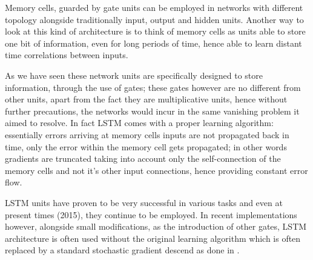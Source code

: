 Memory cells, guarded by gate units can be employed in networks with different topology alongside traditionally 
input, output and hidden units. Another way to look at this kind of architecture is to think of memory cells as units 
able to store one bit of information, even for long periods of time, hence able to learn distant time correlations 
between inputs.

As we have seen these network units are specifically designed to store information, through the use of gates; these 
gates however are no different from other units, apart from the fact they are multiplicative units, hence without 
further precautions, the networks would incur in the same vanishing problem it aimed to resolve. In fact LSTM comes with 
a proper learning algorithm: essentially errors arriving at memory cells inputs are not propagated back in time, only 
the error within the memory cell gets propagated; in other words gradients are truncated taking into account only the 
self-connection of the memory cells and not it's other input connections, hence providing constant error flow.

LSTM units have proven to be very successful in various tasks and even at present times (2015), they continue to be 
employed. In recent implementations however, alongside small modifications, as the introduction of other gates, LSTM 
architecture is often used without the original learning algorithm which is often replaced by a standard stochastic 
gradient descend as done in \cite{lstmGraves}.







